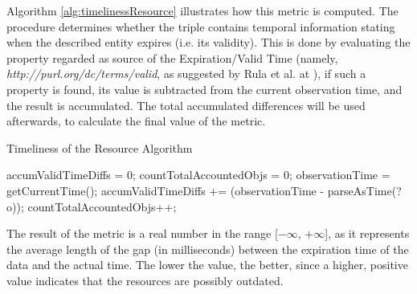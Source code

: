 Algorithm \ref{alg:timelinessResource} illustrates how this metric is computed. The procedure determines whether the triple contains  temporal information stating when the described entity expires (i.e. its validity). This is done by evaluating the property regarded as source  of the Expiration/Valid Time (namely, \textit{http://purl.org/dc/terms/valid}, as suggested by Rula et al. at \cite{Rula2012}), if such a property is found, its value is subtracted from the current observation time, and the result is accumulated. The total accumulated differences will be used afterwards, to calculate the final value of the metric.
\begin{algorithm}
\caption{Timeliness of the Resource Algorithm} \label{alg:timelinessResource}
\begin{algorithmic}[1]
\State accumValidTimeDiffs = 0;
\State countTotalAccountedObjs = 0;
\State observationTime = getCurrentTime();
\EndProcedure
{}
\State accumValidTimeDiffs += (observationTime - parseAsTime(?o));
\State countTotalAccountedObjs++;
\EndIf
{}
\EndProcedure
\end{algorithmic}
\end{algorithm}
The result of the metric is a real number in the range [$-\infty$, $+\infty$], as it represents the average length of the gap (in  milliseconds) between the expiration time of the data and the actual time. The lower the value, the better, since a higher, positive value indicates that the resources are possibly outdated.


